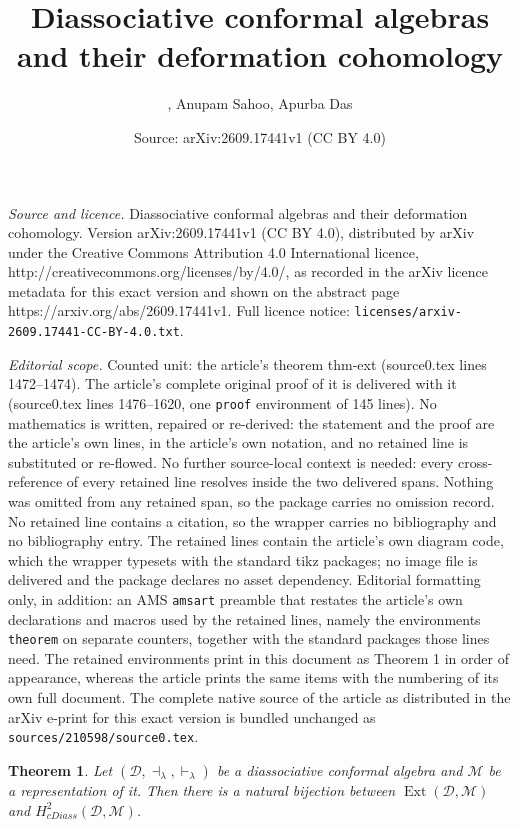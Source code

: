 \documentclass[10pt,a4paper]{amsart}
\title{Diassociative conformal algebras and their deformation cohomology}
\author{, Anupam Sahoo, Apurba Das}
\date{Source: arXiv:2609.17441v1 (CC BY 4.0)}
\newtheorem{theorem}{Theorem}
\newcommand{\D}{\mathcal{D}}
\newcommand{\M}{\mathcal{M}}
\newcommand{\la}{\lambda}
\begin{document}
\maketitle

\noindent\emph{Source and licence.} Diassociative conformal algebras and their deformation cohomology. Version arXiv:2609.17441v1 (CC BY 4.0), distributed by arXiv under the Creative Commons Attribution 4.0 International licence, http://creativecommons.org/licenses/by/4.0/, as recorded in the arXiv licence metadata for this exact version and shown on the abstract page https://arxiv.org/abs/2609.17441v1. Full licence notice: \texttt{licenses/arxiv-2609.17441-CC-BY-4.0.txt}.\par\smallskip

\noindent\textit{Editorial scope.} Counted unit: the article's theorem thm-ext (source0.tex lines 1472--1474). The article's complete original proof of it is delivered with it (source0.tex lines 1476--1620, one \texttt{proof} environment of 145 lines). No mathematics is written, repaired or re-derived: the statement and the proof are the article's own lines, in the article's own notation, and no retained line is substituted or re-flowed.  No further source-local context is needed: every cross-reference of every retained line resolves inside the two delivered spans.  Nothing was omitted from any retained span, so the package carries no omission record.  No retained line contains a citation, so the wrapper carries no bibliography and no bibliography entry.  The retained lines contain the article's own diagram code, which the wrapper typesets with the standard tikz packages; no image file is delivered and the package declares no asset dependency.  Editorial formatting only, in addition: an AMS \texttt{amsart} preamble that restates the article's own declarations and macros used by the retained lines, namely the environments \texttt{theorem} on separate counters, together with the standard packages those lines need.  The retained environments print in this document as Theorem 1 in order of appearance, whereas the article prints the same items with the numbering of its own full document.  The complete native source of the article as distributed in the arXiv e-print for this exact version is bundled unchanged as \texttt{sources/210598/source0.tex}.
\begin{theorem}\label{thm-ext}
Let $(\D,\dashv_{\la},\vdash_{\la})$ be a diassociative conformal algebra and $\M$ be a representation of it. Then there is a natural bijection between $\operatorname{Ext}(\D,\M)$ and $H_{cDiass}^{2}(\D,\M)$.
\end{theorem}
\end{document}

